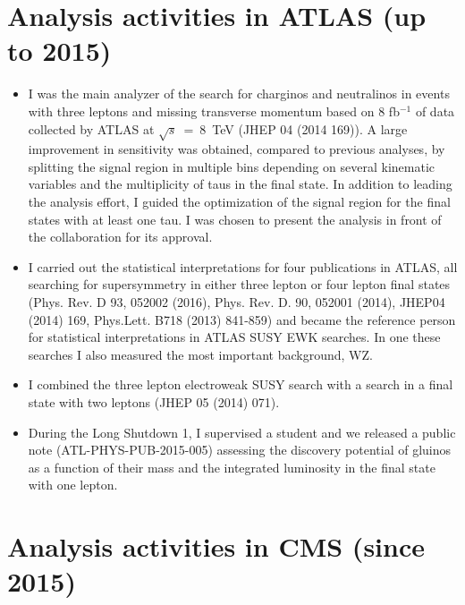 \documentclass[]{cv} %
\begin{document}
\ifresume
\begin{resume}

\section{Analysis activities in ATLAS (up to 2015)}

\begin{itemize}
  \item I was the main analyzer of the search for charginos and neutralinos in
        events with three leptons and missing transverse momentum based on 8 fb$^{-1}$
        of data collected by ATLAS at $\sqrt{s}$~=~8~TeV (JHEP 04 (2014 169)). A large
        improvement in sensitivity was obtained, compared to previous analyses, by
        splitting the signal region in multiple bins depending on several kinematic
        variables and the multiplicity of taus in the final state. In addition to
        leading the analysis effort, I guided the optimization of the signal region
        for the final states with at least one tau. I was chosen to present the
        analysis in front of the collaboration for its approval.
  \item I carried out the statistical interpretations for four publications in
        ATLAS, all searching for supersymmetry in either three lepton or four lepton
        final states (Phys. Rev. D 93, 052002 (2016), Phys. Rev. D. 90, 052001 (2014),
        JHEP04 (2014) 169, Phys.Lett. B718 (2013) 841-859) and became the reference
        person for statistical interpretations in ATLAS SUSY EWK searches. In
        one these searches I also measured the most important background, WZ.
  \item I combined the three lepton electroweak SUSY search with a search in a
        final state with two leptons (JHEP 05 (2014) 071).
  \item During the Long Shutdown 1, I supervised a student and we released a
        public note (ATL-PHYS-PUB-2015-005) assessing the discovery potential of
        gluinos as a function of their mass and the integrated luminosity in the
        final state with one lepton.
\end{itemize}

\vspace{12pt}
\section{Analysis activities in CMS (since 2015)}


\end{resume}
\end{document}
